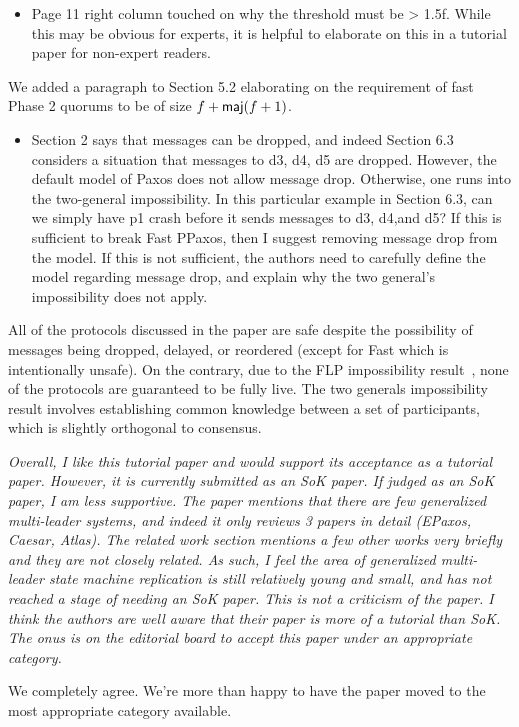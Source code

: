 \documentclass[letterpaper,twocolumn,10pt]{article}
\newenvironment{reviewerquote}
{\list{}{\leftmargin=\parindent\rightmargin=0in}\item[] \itshape \color{ReviewerDarkGray}}%
{\endlist}
\begin{document}
\begin{reviewerquote}
  \begin{itemize}
    \item
      Page 11 right column touched on why the threshold must be > 1.5f. While
      this may be obvious for experts, it is helpful to elaborate on this in a
      tutorial paper for non-expert readers.
  \end{itemize}
\end{reviewerquote}

We added a paragraph to Section 5.2 elaborating on the requirement of fast
Phase 2 quorums to be of size $f + \textsf{maj}(f+1)$.

\begin{reviewerquote}
  \begin{itemize}
    \item
      Section 2 says that messages can be dropped, and indeed Section 6.3
      considers a situation that messages to d3, d4, d5 are dropped. However,
      the default model of Paxos does not allow message drop. Otherwise, one
      runs into the two-general impossibility. In this particular example in
      Section 6.3, can we simply have p1 crash before it sends messages to d3,
      d4,and d5? If this is sufficient to break Fast PPaxos, then I suggest
      removing message drop from the model. If this is not sufficient, the
      authors need to carefully define the model regarding message drop, and
      explain why the two general's impossibility does not apply.
  \end{itemize}
\end{reviewerquote}

All of the protocols discussed in the paper are safe despite the possibility of
messages being dropped, delayed, or reordered (except for Fast \BPaxos{} which
is intentionally unsafe). On the contrary, due to the FLP impossibility
result~\cite{fischer1982impossibility}, none of the protocols are guaranteed to
be fully live. The two generals impossibility result involves establishing
common knowledge between a set of participants, which is slightly orthogonal to
consensus.

\begin{reviewerquote}
  Overall, I like this tutorial paper and would support its acceptance as a
  tutorial paper. However, it is currently submitted as an SoK paper. If judged
  as an SoK paper, I am less supportive. The paper mentions that there are few
  generalized multi-leader systems, and indeed it only reviews 3 papers in
  detail (EPaxos, Caesar, Atlas). The related work section mentions a few other
  works very briefly and they are not closely related. As such, I feel the area
  of generalized multi-leader state machine replication is still relatively
  young and small, and has not reached a stage of needing an SoK paper. This is
  not a criticism of the paper. I think the authors are well aware that their
  paper is more of a tutorial than SoK. The onus is on the editorial board to
  accept this paper under an appropriate category.
\end{reviewerquote}

We completely agree. We're more than happy to have the paper moved to the most
appropriate category available.




\end{document}
